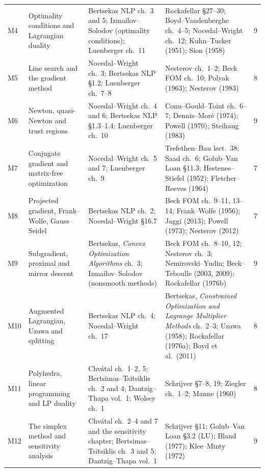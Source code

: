 \documentclass[11pt,a4paper]{article}
\begin{document}
\begin{longtable}{@{}L{0.9cm} L{3.3cm} L{4.1cm} L{4.7cm} L{1.2cm}@{}}
M4 & Optimality conditions and Lagrangian duality
   & Bertsekas NLP ch.~3 and 5; Izmailov--Solodov (optimality conditions); Luenberger ch.~11
   & Rockafellar \S 27--30; Boyd--Vandenberghe ch.~4--5; Nocedal--Wright ch.~12; Kuhn--Tucker (1951); Sion (1958)
   & 9 \\

M5 & Line search and the gradient method
   & Nocedal--Wright ch.~3; Bertsekas NLP \S 1.2; Luenberger ch.~7--8
   & Nesterov ch.~1--2; Beck FOM ch.~10; Polyak (1963); Nesterov (1983)
   & 8 \\

M6 & Newton, quasi-Newton and trust regions
   & Nocedal--Wright ch.~4 and 6; Bertsekas NLP \S 1.3--1.4; Luenberger ch.~10
   & Conn--Gould--Toint ch.~6--7; Dennis--Mor\'e (1974); Powell (1970); Steihaug (1983)
   & 9 \\

M7 & Conjugate gradient and matrix-free optimization
   & Nocedal--Wright ch.~5 and 7; Luenberger ch.~9
   & Trefethen--Bau lect.~38; Saad ch.~6; Golub--Van Loan \S 11.3; Hestenes--Stiefel (1952); Fletcher--Reeves (1964)
   & 7 \\

M8 & Projected gradient, Frank--Wolfe, Gauss--Seidel
   & Bertsekas NLP ch.~2; Nocedal--Wright \S 16.7
   & Beck FOM ch.~9--11, 13--14; Frank--Wolfe (1956); Jaggi (2013); Powell (1973); Nesterov (2012)
   & 7 \\

M9 & Subgradient, proximal and mirror descent
   & Bertsekas, \emph{Convex Optimization Algorithms} ch.~3; Izmailov--Solodov (nonsmooth methods)
   & Beck FOM ch.~8--10, 12; Nesterov ch.~3; Nemirovski--Yudin; Beck--Teboulle (2003, 2009); Rockafellar (1976b)
   & 9 \\

M10 & Augmented Lagrangian, Uzawa and splitting
   & Bertsekas NLP ch.~4; Nocedal--Wright ch.~17
   & Bertsekas, \emph{Constrained Optimization and Lagrange Multiplier Methods} ch.~2--3; Uzawa (1958); Rockafellar (1976a); Boyd et al.\ (2011)
   & 8 \\

M11 & Polyhedra, linear programming and LP duality
   & Chv\'atal ch.~1--2, 5; Bertsimas--Tsitsiklis ch.~2 and 4; Dantzig--Thapa vol.~1; Wolsey ch.~1
   & Schrijver \S 7--8, 19; Ziegler ch.~1--2; Manne (1960)
   & 8 \\

M12 & The simplex method and sensitivity analysis
   & Chv\'atal ch.~2--4 and 7 and the sensitivity chapter; Bertsimas--Tsitsiklis ch.~3 and 5; Dantzig--Thapa vol.~1
   & Schrijver \S 11; Golub--Van Loan \S 3.2 (LU); Bland (1977); Klee--Minty (1972)
   & 9 \\


\end{longtable}
\end{document}
